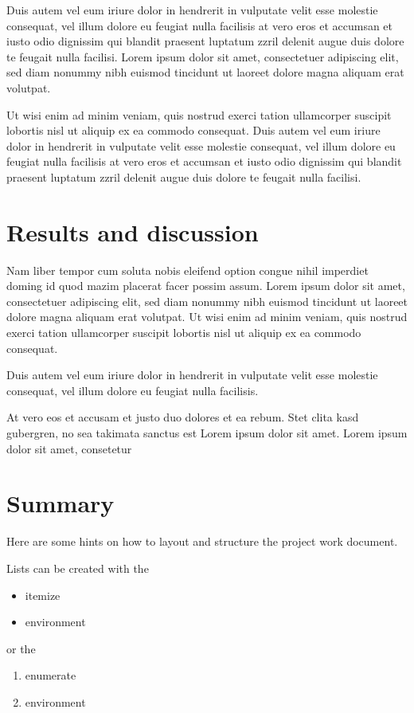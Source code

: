 \documentclass[11pt]{article} %
\begin{document}
Duis autem vel eum iriure dolor in hendrerit in vulputate velit esse molestie consequat, vel illum dolore eu feugiat nulla facilisis at vero eros et accumsan et iusto odio dignissim qui blandit praesent luptatum zzril delenit augue duis dolore te feugait nulla facilisi. Lorem ipsum dolor sit amet, consectetuer adipiscing elit, sed diam nonummy nibh euismod tincidunt ut laoreet dolore magna aliquam erat volutpat.   

Ut wisi enim ad minim veniam, quis nostrud exerci tation ullamcorper suscipit lobortis nisl ut aliquip ex ea commodo consequat. Duis autem vel eum iriure dolor in hendrerit in vulputate velit esse molestie consequat, vel illum dolore eu feugiat nulla facilisis at vero eros et accumsan et iusto odio dignissim qui blandit praesent luptatum zzril delenit augue duis dolore te feugait nulla facilisi.   

\section{Results and discussion}

Nam liber tempor cum soluta nobis eleifend option congue nihil imperdiet doming id quod mazim placerat facer possim assum. Lorem ipsum dolor sit amet, consectetuer adipiscing elit, sed diam nonummy nibh euismod tincidunt ut laoreet dolore magna aliquam erat volutpat. Ut wisi enim ad minim veniam, quis nostrud exerci tation ullamcorper suscipit lobortis nisl ut aliquip ex ea commodo consequat.   

Duis autem vel eum iriure dolor in hendrerit in vulputate velit esse molestie consequat, vel illum dolore eu feugiat nulla facilisis.   

At vero eos et accusam et justo duo dolores et ea rebum. Stet clita kasd gubergren, no sea takimata sanctus est Lorem ipsum dolor sit amet. Lorem ipsum dolor sit amet, consetetur

\section{Summary}

Here are some hints on how to layout and structure the project work document.

Lists can be created with the
\begin{itemize}
	\item itemize
	\item environment
\end{itemize}
or the
\begin{enumerate}
	\item enumerate
	\item environment
\end{enumerate}
\end{document}
